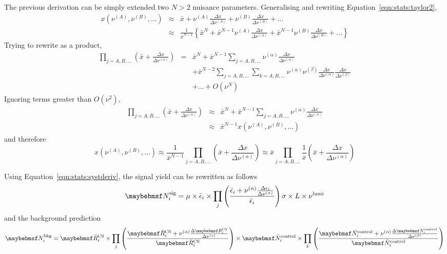 The previous derivation can be simply extended two $N > 2$ nuisance
parameters. Generalising and rewriting Equation~\ref{eqn:stats:taylor2},
\begin{eqnarray*}
x(\nu^{(A)}, \nu^{(B)}, \ldots) &\approx& \bar{x} +
\nu^{(A)}\frac{\Delta x}{\Delta\nu^{(A)}} +
\nu^{(B)}\frac{\Delta x}{\Delta\nu^{(B)}} + \ldots \\
&\approx& \frac{1}{\bar{x}^{N-1}} \left\{ \bar{x}^N +
\bar{x}^{N-1} \nu^{(A)}\frac{\Delta x}{\Delta\nu^{(A)}} +
\bar{x}^{N-1} \nu^{(B)}\frac{\Delta x}{\Delta\nu^{(B)}} + \ldots \right\}
\end{eqnarray*}
Trying to rewrite as a product,
\begin{eqnarray*}
\prod_{j=A, B, \ldots} \left(\bar{x} + \frac{\Delta x}{\Delta\nu^{(\alpha)}}\right) &=&
\bar{x}^N + \bar{x}^{N-1} \sum_{j=A, B, \ldots} \nu^{(\alpha)}\frac{\Delta x}{\Delta \nu^{(\alpha)}} \\
&&+ \bar{x}^{N-2}\sum_{j=A, B, \ldots} \sum_{k=A, B, \ldots} \nu^{(\alpha)}\nu^{(\beta)}\frac{\Delta x}{\Delta
  \nu^{(\alpha)}}\frac{\Delta x}{\Delta \nu^{(\beta)}} \\
&&+ \ldots +O(\nu^N)
\end{eqnarray*}
Ignoring terms greater than $O(\nu^2)$,
\begin{eqnarray*}
\prod_{j=A, B, \ldots} \left(\bar{x} + \frac{\Delta x}{\Delta\nu^{(\alpha)}}\right) &\approx&
\bar{x}^N + \bar{x}^{N-1} \sum_{j=A, B, \ldots} \nu^{(\alpha)}\frac{\Delta x}{\Delta
  \nu^{(\alpha)}} \\
&\approx& \bar{x}^{N-1} x(\nu^{(A)}, \nu^{(B)}, \ldots)
\end{eqnarray*}
and therefore
\begin{equation}
x(\nu^{(A)}, \nu^{(B)}, \ldots) \approx \frac{1}{\bar{x}^{N-1}} \prod_{j = A, B,
  \ldots} \left(\bar{x} + \frac{\Delta x}{\Delta\nu^{(\alpha)}}\right) \approx
\bar{x} \prod_{j = A, B,
  \ldots} \frac{1}{\bar{x}}\left(\bar{x} + \frac{\Delta x}{\Delta\nu^{(\alpha)}}\right)
\label{eqn:stats:systderiv}
\end{equation}

Using Equation~\ref{eqn:stats:systderiv}, the signal yield can be rewritten as follows
\begin{equation}
\NSigi = \mu \times \bar{\epsilon}_i \times \prod_{j}\left(\frac{\bar{\epsilon}_i
    + \nu^{(\alpha)}\frac{\Delta\epsilon_i}{\Delta\nu^{(\alpha)}}}{\bar{\epsilon}_i}\right) \sigma \times L \times \nu^{\textrm{lumi}}
\end{equation}
and the background prediction
\begin{equation}
\NBkgi = \RbarCS_i \times \prod_{j}\left( \frac{\RbarCS_i
    + \nu^{(\alpha)}\frac{\Delta\RCSi}{\Delta\nu^{(\alpha)}}}{\RbarCS_i}\right)
\times \NbarControl_i \times \prod_{k}\left( \frac{\NbarControl_i
    + \nu^{(\alpha)}\frac{\Delta\NControli}{\Delta\nu^{(\beta)}}}{\NbarControl_i}\right)
\end{equation}

